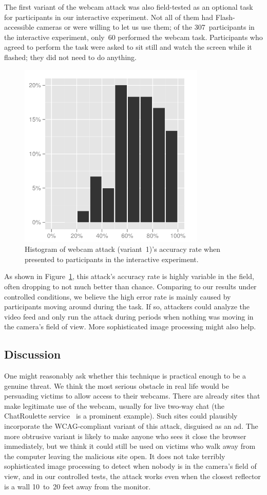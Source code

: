 \documentclass[conference]{IEEEtran}
\begin{document}
The first variant of the webcam attack was also field-tested as an
optional task for participants in our interactive experiment.  Not all
of them had Flash-accessible cameras or were willing to let us use
them; of the 307~participants in the interactive experiment, only~60
performed the webcam task.  Participants who agreed to perform the
task were asked to sit still and watch the screen while it flashed;
they did not need to do anything.

\begin{figure}
\centerline{\includegraphics[width=3.5in]{webcam}}
\caption{Histogram of webcam attack (variant~1)'s accuracy rate when
  presented to participants in the interactive experiment.}
\label{fig:webcam}
\end{figure}

As shown in Figure~\ref{fig:webcam}, this attack's accuracy rate is
highly variable in the field, often dropping to not much better than
chance.  Comparing to our results under controlled conditions, we
believe the high error rate is mainly caused by participants moving
around during the task.  If so, attackers could analyze the video feed
and only run the attack during periods when nothing was moving in the
camera's field of view.  More sophisticated image processing might
also help.

\subsection{Discussion}

One might reasonably ask whether this technique is practical enough to
be a genuine threat.  We think the most serious obstacle in real life
would be persuading victims to allow access to their webcams.  There
are already sites that make legitimate use of the webcam, usually for
live two-way chat (the ChatRoulette service~\cite{chatroulette} is a
prominent example).  Such sites could plausibly incorporate the
WCAG-compliant variant of this attack, disguised as an ad.  The more
obtrusive variant is likely to make anyone who sees it close the
browser immediately, but we think it could still be used on victims
who walk away from the computer leaving the malicious site open.  It
does not take terribly sophisticated image processing to detect when
nobody is in the camera's field of view, and in our controlled tests,
the attack works even when the closest reflector is a wall 10~to~20
feet away from the monitor.
\end{document}
